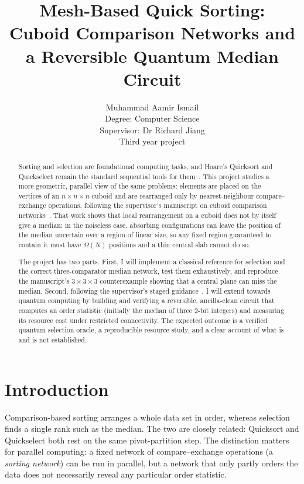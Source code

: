 \documentclass[11pt,a4paper]{article}
\title{Mesh-Based Quick Sorting:\\Cuboid Comparison Networks and a Reversible Quantum Median Circuit}
\author{Muhammad Aamir Ismail \\
Degree: Computer Science\\
Supervisor: Dr Richard Jiang\\
Third year project}
\begin{document}
\maketitle

\begin{abstract}
Sorting and selection are foundational computing tasks, and Hoare's Quicksort and Quickselect remain the standard sequential tools for them~\cite{hoare62,hoare61}. This project studies a more geometric, parallel view of the same problems: elements are placed on the vertices of an $n\times n\times n$ cuboid and are rearranged only by nearest-neighbour compare--exchange operations, following the supervisor's manuscript on cuboid comparison networks~\cite{jiang}. That work shows that local rearrangement on a cuboid does not by itself give a median: in the noiseless case, absorbing configurations can leave the position of the median uncertain over a region of linear size, so any fixed region guaranteed to contain it must have $\Omega(N)$ positions and a thin central slab cannot do so.

The project has two parts. First, I will implement a classical reference for selection and the correct three-comparator median network, test them exhaustively, and reproduce the manuscript's $3\times3\times3$ counterexample showing that a central plane can miss the median. Second, following the supervisor's staged guidance~\cite{guide}, I will extend towards quantum computing by building and verifying a reversible, ancilla-clean circuit that computes an order statistic (initially the median of three 2-bit integers) and measuring its resource cost under restricted connectivity. The expected outcome is a verified quantum selection oracle, a reproducible resource study, and a clear account of what is and is not established.
\end{abstract}

\section{Introduction}

Comparison-based sorting arranges a whole data set in order, whereas selection finds a single rank such as the median. The two are closely related: Quicksort and Quickselect both rest on the same pivot-partition step. The distinction matters for parallel computing: a fixed network of compare--exchange operations (a \emph{sorting network}) can be run in parallel, but a network that only partly orders the data does not necessarily reveal any particular order statistic.
\end{document}
